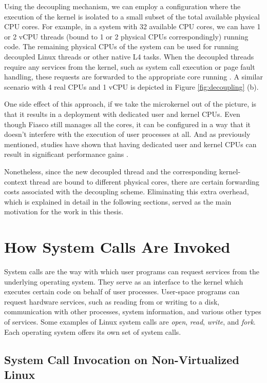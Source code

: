 Using the decoupling mechanism, we can employ a configuration where the
execution of the \llinux kernel is isolated to a small subset of the total
available physical CPU cores. For example, in a system with 32 available CPU
cores, we can have 1 or 2 vCPU threads (bound to 1 or 2 physical CPUs
correspondingly) running \llinux code. The remaining physical CPUs of the
system can be used for running decoupled Linux threads or other native L4
tasks. When the decoupled threads require any services from the \llinux kernel,
such as system call execution or page fault handling, these requests are
forwarded to the appropriate core running \llinux. A similar scenario with 4
real CPUs and 1 vCPU is depicted in Figure \ref{fig:decoupling} (b).

One side effect of this approach, if we take the microkernel out of the
picture, is that it results in a deployment with dedicated user and kernel
CPUs. Even though Fiasco still manages all the cores, it can be configured in a
way that it doesn't interfere with the execution of user processes at all. And
as previously mentioned, studies have shown that having dedicated user and
kernel CPUs can result in significant performance gains \cite{dedicated_cpus}.

Nonetheless, since the new decoupled thread and the corresponding
kernel-context thread are bound to different physical cores, there are certain
forwarding costs associated with the decoupling scheme. Eliminating this extra
overhead, which is explained in detail in the following sections, served as the
main motivation for the work in this thesis.

\section{How System Calls Are Invoked}

System calls are the way with which user programs can request services from the
underlying operating system. They serve as an interface to the kernel which
executes certain code on behalf of user processes. User-space programs can
request hardware services, such as reading from or writing to a disk,
communication with other processes, system information, and various other types
of services. Some examples of Linux system calls are \emph{open}, \emph{read},
\emph{write}, and \emph{fork}. Each operating system offers its own set of
system calls.

\subsection{System Call Invocation on Non-Virtualized Linux}

